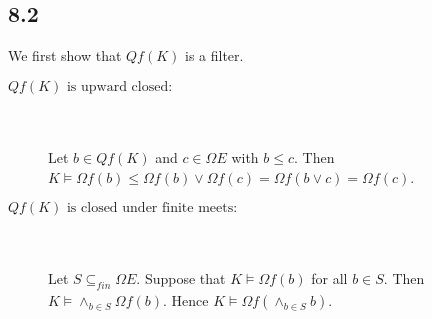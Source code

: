 \documentclass{article}
\begin{document}
\subsection*{8.2}

We first show that $Qf(K)$ is a filter.

\begin{description}

\item[$Qf(K)\text{ is upward closed}:$]~\\~\\
Let $b \in Qf(K)$ and $c \in \Omega E$ with $b \leq c$. Then $K \vDash \Omega f(b) \leq \Omega f (b) \vee \Omega f (c) = \Omega f(b \vee c) = \Omega f(c)$.

\item[$Qf(K)\text{ is closed under finite meets}:$]~\\~\\
Let $S \subseteq_{\mathit{fin}} \Omega E$. Suppose that $K \vDash \Omega f(b)$ for all $b \in S$. Then $K \vDash \wedge_{b \in S} \Omega f(b)$.
Hence $K \vDash \Omega f(\wedge_{b \in S} b)$.
  
\end{description}
\end{document}
